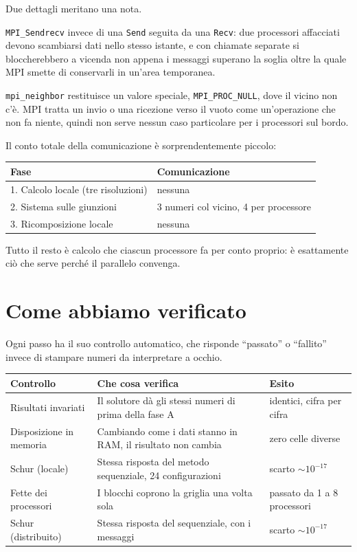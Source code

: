 \documentclass[11pt,a4paper]{article}
\newcommand{\cd}[1]{\texttt{\small #1}}
\begin{document}
Due dettagli meritano una nota.

\cd{MPI\_Sendrecv} invece di una \cd{Send} seguita da una \cd{Recv}: due
processori affacciati devono scambiarsi dati nello stesso istante, e con
chiamate separate si bloccherebbero a vicenda non appena i messaggi superano la
soglia oltre la quale MPI smette di conservarli in un'area temporanea.

\cd{mpi\_neighbor} restituisce un valore speciale, \cd{MPI\_PROC\_NULL}, dove il
vicino non c'è. MPI tratta un invio o una ricezione verso il vuoto come
un'operazione che non fa niente, quindi non serve nessun caso particolare per i
processori sul bordo.

\medskip
Il conto totale della comunicazione è sorprendentemente piccolo:

\begin{center}
\begin{tabular}{@{}L{7.2cm}L{7.2cm}@{}}
\toprule
\textbf{Fase} & \textbf{Comunicazione} \\
. Calcolo locale (tre risoluzioni) & nessuna \\
2. Sistema sulle giunzioni & 3 numeri col vicino, 4 per processore \\
3. Ricomposizione locale & nessuna \\
\bottomrule
\end{tabular}
\end{center}

\medskip
Tutto il resto è calcolo che ciascun processore fa per conto proprio: è
esattamente ciò che serve perché il parallelo convenga.

\section{Come abbiamo verificato}

Ogni passo ha il suo controllo automatico, che risponde ``passato'' o
``fallito'' invece di stampare numeri da interpretare a occhio.

\begin{center}
\begin{tabular}{@{}L{3.4cm}L{7.3cm}L{3.7cm}@{}}
\toprule
\textbf{Controllo} & \textbf{Che cosa verifica} & \textbf{Esito} \\
\midrule
Risultati invariati &
Il solutore dà gli stessi numeri di prima della fase A &
identici, cifra per cifra \\[4pt]
Disposizione in memoria &
Cambiando come i dati stanno in RAM, il risultato non cambia &
zero celle diverse \\[4pt]
Schur (locale) &
Stessa risposta del metodo sequenziale, 24 configurazioni &
scarto $\sim 10^{-17}$ \\[4pt]
Fette dei processori &
I blocchi coprono la griglia una volta sola &
passato da 1 a 8 processori \\[4pt]
Schur (distribuito) &
Stessa risposta del sequenziale, con i messaggi &
scarto $\sim 10^{-17}$ \\
\bottomrule
\end{tabular}
\end{center}
\end{document}
